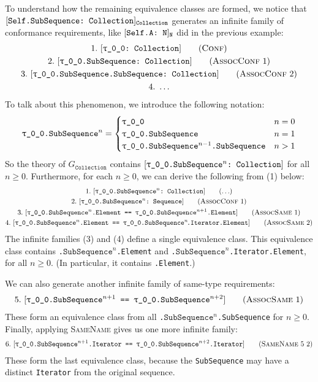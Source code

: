 \documentclass[../generics]{subfiles}
\begin{document}
\begin{example}
To understand how the remaining equivalence classes are formed, we notice that $[\texttt{Self.SubSequence:~Collection}]_{\texttt{Collection}}$ generates an infinite family of conformance requirements, like $[\texttt{Self.A:~N}]_{\texttt{N}}$ did in the previous example:
\begin{gather*}
\ConfStep{\rT}{Collection}{1}\\
\AssocConfStep{1}{\rT.SubSequence}{Collection}{2}\\
\AssocConfStep{2}{\rT.SubSequence.SubSequence}{Collection}{3}\\
4.\ \ldots
\end{gather*}
To talk about this phenomenon, we introduce the following notation:
\begin{gather*}
\texttt{\rT.$\texttt{SubSequence}^n$} = \begin{cases}
\rT&n=0\\
\texttt{\rT.SubSequence}&n=1\\
\texttt{\rT.SubSequence}^{n-1}\texttt{.SubSequence}&n>1
\end{cases}
\end{gather*}
So the theory of $G_\texttt{Collection}$ contains $\ConfReq{\rT.$\texttt{SubSequence}^n$}{Collection}$ for all $n\geq 0$. Furthermore, for each $n\geq 0$, we can derive the following from (1) below:
\begin{gather*}
\AnyStep{\ConfReq{\rT.$\texttt{SubSequence}^n$}{Collection}}{1}\\
\AssocConfStep{1}{\rT.$\texttt{SubSequence}^n$}{Sequence}{2}\\
\AssocSameStep{1}{\rT.$\texttt{SubSequence}^n$.Element}{\rT.$\texttt{SubSequence}^{n+1}$.Element}{3}\\
\AssocSameStep{2}{\rT.$\texttt{SubSequence}^n$.Element}{\rT.$\texttt{SubSequence}^n\!$.Iterator.Element}{4}
\end{gather*}
The infinite families (3) and (4) define a single equivalence class. This equivalence class contains \texttt{\rT.$\texttt{SubSequence}^n$.Element} and \texttt{\rT.$\texttt{SubSequence}^n$.Iterator.Element}, for all $n\geq 0$. (In particular, it contains \texttt{\rT.Element}.)

We can also generate another infinite family of same-type requirements:
\begin{gather*}
\AssocSameStep{1}{\rT.$\texttt{SubSequence}^{n+1}$}{\rT.$\texttt{SubSequence}^{n+2}$}{5}
\end{gather*}
These form an equivalence class from all \texttt{\rT.$\texttt{SubSequence}^n$.SubSequence} for $n\geq 0$. Finally, applying \textsc{SameName} gives us one more infinite family:
\begin{gather*}
\SameNameStep{5}{2}{\rT.$\texttt{SubSequence}^{n+1}$.Iterator}{\rT.$\texttt{SubSequence}^{n+2}$.Iterator}{6}
\end{gather*}
These form the last equivalence class, because the \texttt{SubSequence} may have a distinct \texttt{Iterator} from the original sequence.


\end{example}
\end{document}
